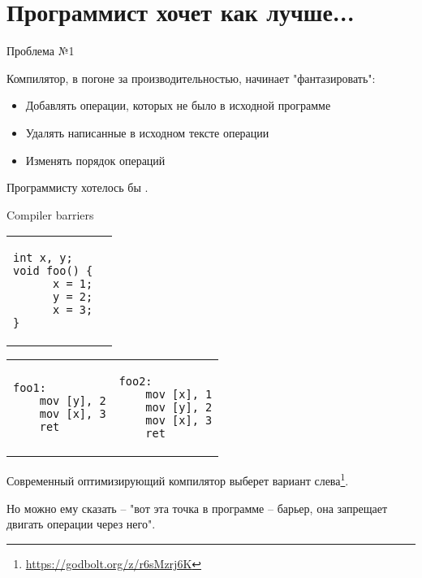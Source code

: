 
\section{Программист хочет как лучше...}
\showTOC

\begin{frame}[t]{Проблема №1}

Компилятор, в погоне за производительностью, начинает "фантазировать":
\begin{itemize}
	\pause
	\item Добавлять операции, которых не было в исходной программе

	\pause
	\item Удалять написанные в исходном тексте операции

	\pause
	\item Изменять порядок операций
\end{itemize}

\pause
Программисту хотелось бы .
\pause

\end{frame}

\begin{frame}[t, fragile]{Compiler barriers}

\vspace{-0.5cm}
\begin{tabular}{p{} p{}}
\begin{verbatim}
int x, y;
void foo() {
      x = 1;
      y = 2;
      x = 3;
}
\end{verbatim}
&
\end{tabular}

\vspace{-0.5cm}

\pause

\begin{tabular}{p{} p{}}

\begin{verbatim}
foo1:
    mov [y], 2
    mov [x], 3
    ret
\end{verbatim}

& 

\begin{verbatim}
foo2:
    mov [x], 1
    mov [y], 2
    mov [x], 3
    ret
\end{verbatim}

\end{tabular}

\pause
Современный оптимизирующий компилятор выберет вариант слева\footnote<3->{\tiny\url{https://godbolt.org/z/r6sMzrj6K}}.

\pause
Но можно ему сказать -- "вот эта точка в программе -- барьер, она запрещает двигать операции через него".

\end{frame}


